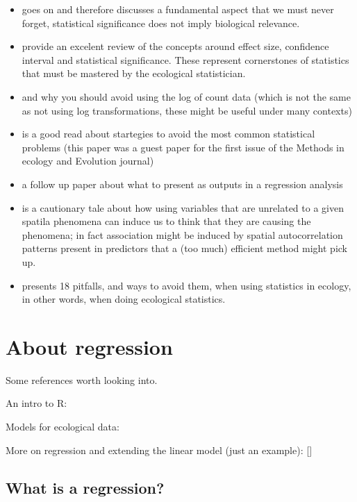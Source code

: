\documentclass[
]{book}
\begin{document}
\begin{itemize}
\item
  \citet{Martinez-Abrain2008} goes on and therefore discusses a fundamental aspect that we must never forget, statistical significance does not imply biological relevance.
\item
  \citet{Nakagawa2007} provide an excelent review of the concepts around effect size, confidence interval and statistical significance. These represent cornerstones of statistics that must be mastered by the ecological statistician.
\item
  \citet{OHara2010} and why you should avoid using the log of count data (which is not the same as not using log transformations, these might be useful under many contexts)
\item
  \citet{Zuur2009} is a good read about startegies to avoid the most common statistical problems (this paper was a guest paper for the first issue of the Methods in ecology and Evolution journal)
\item
  \citet{Zuur2016} a follow up paper about what to present as outputs in a regression analysis
\item
  \citet{Fourcade2017} is a cautionary tale about how using variables that are unrelated to a given spatila phenomena can induce us to think that they are causing the phenomena; in fact association might be induced by spatial autocorrelation patterns present in predictors that a (too much) efficient method might pick up.
\item
  \citet{Steel2013} presents 18 pitfalls, and ways to avoid them, when using statistics in ecology, in other words, when doing ecological statistics.
\end{itemize}

\hypertarget{about-regression}{%
\chapter{About regression}\label{about-regression}}

Some references worth looking into.

An intro to R: \citep{Zuur2009a}

Models for ecological data: \citep{Zuur2007}

More on regression and extending the linear model (just an example): {[}\citet{Faraway2006}{]}\citep{Zuur2009b}

\hypertarget{what-is-a-regression}{%
\section{What is a regression?}\label{what-is-a-regression}}
\end{document}
